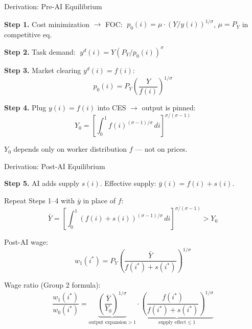\documentclass[aspectratio=169]{beamer}
\begin{document}
\begin{frame}{Derivation: Pre-AI Equilibrium}

\textbf{Step 1.} Cost minimization $\rightarrow$ FOC:
$\;p_0(i)=\mu\cdot(Y/y(i))^{1/\sigma}$, \quad $\mu=P_Y$ in competitive eq.

\medskip
\textbf{Step 2.} Task demand: $\;y^d(i)=Y(P_Y/p_0(i))^{\sigma}$

\medskip
\textbf{Step 3.} Market clearing $y^d(i)=f(i)$:
\[
  p_0(i) = P_Y\!\left(\frac{Y}{f(i)}\right)^{\!1/\sigma}
\]

\textbf{Step 4.} Plug $y(i)=f(i)$ into CES $\rightarrow$ output is pinned:
\[
  \boxed{Y_0 = \left[\int_0^1 f(i)^{(\sigma-1)/\sigma}\,di
  \right]^{\!\sigma/(\sigma-1)}}
\]

$Y_0$ depends only on worker distribution $f$ --- not on prices.

\end{frame}

\begin{frame}{Derivation: Post-AI Equilibrium}

\textbf{Step 5.} AI adds supply $s(i)$. Effective supply:
$\bar y(i)=f(i)+s(i)$.

\medskip
Repeat Steps 1--4 with $\bar y$ in place of $f$:
\[
  \bar Y = \left[\int_0^1 (f(i)+s(i))^{(\sigma-1)/\sigma}\,di
  \right]^{\!\sigma/(\sigma-1)} > Y_0
\]

Post-AI wage:
\[
  \boxed{w_1(i^*) = P_Y\!\left(\frac{\bar Y}{f(i^*)+s(i^*)}\right)^{\!1/\sigma}}
\]

\medskip
Wage ratio (Group 2 formula):
\[
  \frac{w_1(i^*)}{w_0(i^*)}
  = \underbrace{\left(\frac{\bar Y}{Y_0}\right)^{\!1/\sigma}}_{\text{output expansion} > 1}
  \cdot
  \underbrace{\left(\frac{f(i^*)}{f(i^*)+s(i^*)}\right)^{\!1/\sigma}}_{\text{supply effect} \leq 1}
\]

\end{frame}
\end{document}
